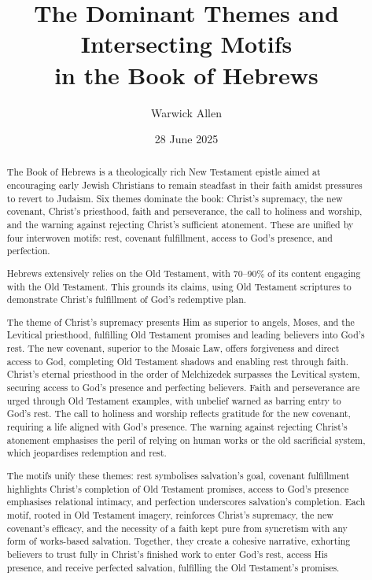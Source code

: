 \documentclass[12pt]{article}
\title{The Dominant Themes and Intersecting Motifs \\ in the Book of Hebrews}
\author{Warwick Allen}
\date{28 June 2025}
\begin{document}
\maketitle

\begin{abstract}
The Book of Hebrews is a theologically rich New Testament epistle aimed at
encouraging early Jewish Christians to remain steadfast in their faith amidst
pressures to revert to Judaism. Six themes dominate the book: Christ’s
supremacy, the new covenant, Christ’s priesthood, faith and perseverance, the
call to holiness and worship, and the warning against rejecting Christ’s
sufficient atonement. These are unified by four interwoven motifs: rest,
covenant fulfillment, access to God’s presence, and perfection.

Hebrews extensively relies on the Old Testament, with 70--90\% of its content
engaging with the Old Testament. This grounds its claims, using Old Testament
scriptures to demonstrate Christ’s fulfillment of God’s redemptive plan.

The theme of Christ’s supremacy presents Him as superior to angels, Moses, and
the Levitical priesthood, fulfilling Old Testament promises and leading
believers into God’s rest. The new covenant, superior to the Mosaic Law, offers
forgiveness and direct access to God, completing Old Testament shadows and
enabling rest through faith. Christ’s eternal priesthood in the order of
Melchizedek surpasses the Levitical system, securing access to God’s presence
and perfecting believers. Faith and perseverance are urged through Old
Testament examples, with unbelief warned as barring entry to God’s rest. The
call to holiness and worship reflects gratitude for the new covenant, requiring
a life aligned with God’s presence. The warning against rejecting Christ’s
atonement emphasises the peril of relying on human works or the old sacrificial
system, which jeopardises redemption and rest.

The motifs unify these themes: rest symbolises salvation’s goal, covenant
fulfillment highlights Christ’s completion of Old Testament promises, access to
God’s presence emphasises relational intimacy, and perfection underscores
salvation’s completion. Each motif, rooted in Old Testament imagery, reinforces
Christ’s supremacy, the new covenant’s efficacy, and the necessity of a faith
kept pure from syncretism with any form of works-based salvation. Together, they
create a cohesive narrative, exhorting believers to trust fully in Christ’s
finished work to enter God’s rest, access His presence, and receive perfected
salvation, fulfilling the Old Testament’s promises.
\end{abstract}
\end{document}
